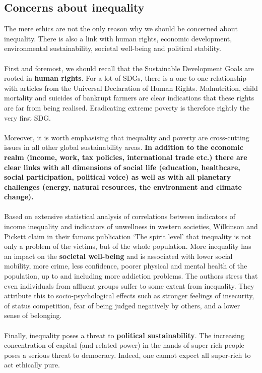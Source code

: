 \documentclass[../summary.tex]{subfiles}
\begin{document}
\subsection{Concerns about inequality}

The mere ethics are not the only reason why we should be concerned about inequality. There is also a link with human rights, economic development, environmental sustainability, societal well-being and political stability.
\\\\
First and foremost, we should recall that the Sustainable Development Goals are rooted in \textbf{human rights}. For a lot of SDGs, there is a one-to-one relationship with articles from the Universal Declaration of Human Rights. Malnutrition, child mortality and suicides of bankrupt farmers are clear indications that these rights are far from being realised. Eradicating extreme poverty is therefore rightly the very first SDG.
\\\\
Moreover, it is worth emphasising that inequality and poverty are cross-cutting issues in all other global sustainability areas. \textbf{In addition to the economic realm (income, work, tax policies, international trade etc.) there are clear links with all dimensions of social life (education, healthcare, social participation, political voice) as well as with all planetary challenges (energy, natural resources, the environment and climate change).}
\\\\
Based on extensive statistical analysis of correlations between indicators of income inequality and indicators of unwellness in western societies, Wilkinson and Pickett claim in their famous publication `The spirit level' that inequality is not only a problem of the victims, but of the whole population. More inequality has an impact on the \textbf{societal well-being} and is associated with lower social mobility, more crime, less confidence, poorer physical and mental health of the population, up to and including more addiction problems. The authors stress that even individuals from affluent groups suffer to some extent from inequality. They attribute this to socio-psychological effects such as stronger feelings of insecurity, of status competition, fear of being judged negatively by others, and a lower sense of belonging.
\\\\
Finally, inequality poses a threat to \textbf{political sustainability}. The increasing concentration of capital (and related power) in the hands of super-rich people poses a serious threat to democracy. Indeed, one cannot expect all super-rich to act ethically pure.
\end{document}
